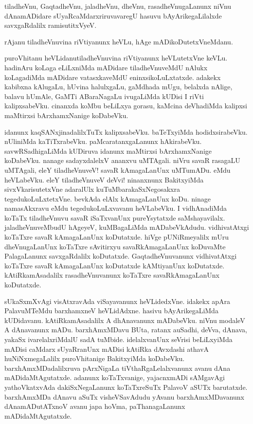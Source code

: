 \begin{mng}
tiladheVnu, GaqtadheVnu, jaladheVnu, dheVnu, rasadheVnugaLanunx niVnu dAnamADidare sUyaRcaMdarxriruvavaregU hasuvu bAyArikegaLilalxde savxgaRdalilx ramisutitxVyeV.
\end{mng}

\begin{mng}
rAjanu tiladheVnuvina riVtiyanunx heVLu, hAge mADikoDutetxVneMdanu.
\end{mng}

\begin{mng}
puroVhitanu heVLidanu\mdash tiladheVnuvina riVtiyanunx heVLutetxVne keVLu. hadinAru koLaga eLiLxniMda mADidare tiladheVnuveMdU nAlukx koLagadiMda mADidare vatasxkaveMdU eninxsikoLuLxtatxde. adakekx kabibxna kAlugaLu, hUvina halulxgaLu, gaMdhada mUgu, belalxda nAlige, balavu hUmAle, GaMTi ABaraNagaLu ivugaLiMda kUDisi I riVti kalipxsabeVku. cinanxda koMbu beLiLxya gorasu, kaMcina deVhadiMda kalipxsi maMtirxsi bArxhamxNanige koDabeVku.
\end{mng}

\begin{mng}
idanunx kaqSANxjinadalilxTuTx kalipxsabeVku. baTeTxyiMda hodidxsirabeVku. nUliniMda kaTiTxrabeVku. paMcaratanxgaLanunx hAkirabeVku. savwRSadhigaLiMda kUDiruva idanunx maMtirxsi bArxhamxNanige koDabeVku. nanage sadayxdalelxV ananxvu uMTAgali. niVru savaR rasagaLU uMTAgali, eleY tiladheVnuveV! savaR kAmagaLanUnx uMTumADu. eMdu heVLabeVku. eleY tiladheVnuveV deVvi! ninanxnunx BakitxyiMda sivxVkarisutetxVne adaralUlx kuTuMbarakaSxNegosakxra tegedukoLuLxtetxVne. bevkAda elAlx kAmagaLanUnx koDu. ninage namasAkxravu eMdu tegedukoLuLxvavanu heVLabeVku. I vidhAnadiMda koTaTx tiladheVnuvu savaR iSaTxvanUnx pureYsytatxde saMshayavilalx. jaladheVnuveMbudU hAgeyeV, kuMBagaLiMda mADabeVkAdudu. vidhivatAtxgi koTaTxre savaR kAmagaLanUnx koDutatxde. hiVge pUNiRmeyalilx mUru dheVnugaLanUnx koTaTxre sAvitirxyu savaRkAmagaLanUnx koDuvaMte PalagaLanunx savxgaRdalilx koDutatxde. GaqtadheVnuvanunx vidhivatAtxgi koTaTxre savaR kAmagaLanUnx koDutatxde kAMtiyanUnx koDutatxde. kAtiRkamAsadalilx rasadheVnuvanunx koTaTxre savaRkAmagaLanUnx koDutatxde.
\end{mng}

\begin{mng}
sUkaSxmXvAgi visAtxravAda viSayavanunx heVLidedxVne. idakekx apAra PalavuMTeMdu barxhamxneV heVLidAdxne. hasivu bAyArikegaLiMda kUDidavanu. kAtiRkamAsadalilx A dhAnavanunx mADabeVku. niVnu modaleV A dAnavanunx mADu. barxhAmxMDavu BUta, ratanx auSadhi, deVva, dAnava, yakaSx ivarelalxriMdalU sadA tuMbide. idelalxvanUnx seVrisi beLiLxyiMda mADisi caMdarx sUyaRranUnx mADisi kAtiRka dAvxdashi athavA huNiNxmegaLalilx puroVhitanige BakitxyiMda koDabeVku. barxhAmxMDadalilxruva pArxNigaLa tiVthaRgaLelalxvanunx avanu dAna mADidaMtAgutatxde. adanunx koTaTxvanige, yajacnxmADi sAMgavAgi yathoVkatxvAda dakiSxNegaLanunx koTaTxreSuTx PalavoV aSUTx barutatxde. barxhAmxMDa dAnavu aSuTx visheVSavAdudu yAvanu barxhAmxMDavanunx dAnamADutATxnoV avanu japa hoVma, paThanagaLanunx mADidaMtAgutatxde.
\end{mng}

